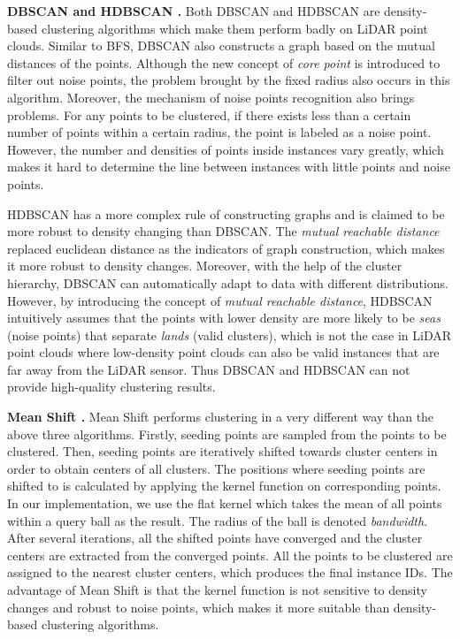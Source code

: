 \documentclass[final]{cvpr}
\begin{document}
\noindent\textbf{DBSCAN \cite{ester1996density} and HDBSCAN \cite{campello2013density}.}
Both DBSCAN and HDBSCAN are density-based clustering algorithms which make them perform badly on LiDAR point clouds.
Similar to BFS, DBSCAN also constructs a graph based on the mutual distances of the points.
Although the new concept of \textit{core point} is introduced to filter out noise points, the problem brought by the fixed radius
also occurs in this algorithm.
Moreover, the mechanism of noise points recognition also brings problems.
For any points to be clustered, if there exists less than a certain number of points within a certain radius, the point is labeled as a noise point.
However, the number and densities of points inside instances vary greatly, which makes it hard to determine the line between instances with little
points and noise points.

HDBSCAN has a more complex rule of constructing graphs and is claimed to be more robust to density changing than
DBSCAN.
The \textit{mutual reachable distance} replaced euclidean distance as the indicators of graph construction, which makes it more robust to
density changes.
Moreover, with the help of the cluster hierarchy, DBSCAN can automatically adapt to data with different distributions.
However, by introducing the concept of \textit{mutual reachable distance}, HDBSCAN intuitively assumes that the points with
lower density are more likely to be \textit{seas} (noise points) that separate \textit{lands} (valid clusters), which
is not the case in LiDAR point clouds where low-density point clouds can also be valid instances that are far away
from the LiDAR sensor.
Thus DBSCAN and HDBSCAN can not provide high-quality clustering results.

\noindent\textbf{Mean Shift \cite{comaniciu2002mean}.}
Mean Shift performs clustering in a very different way than the above three algorithms.
Firstly, seeding points are sampled from the points to be clustered.
Then, seeding points are iteratively shifted towards cluster centers in order
to obtain centers of all clusters.
The positions where seeding points are shifted to is calculated by applying the kernel function
on corresponding points.
In our implementation, we use the flat kernel which takes the mean of all points within a query ball
as the result.
The radius of the ball is denoted \textit{bandwidth}.
After several iterations, all the shifted points have converged and the cluster centers are extracted from the converged points.
All the points to be clustered are assigned to the nearest cluster centers, which produces the final instance IDs.
The advantage of Mean Shift is that the kernel function is not sensitive to density changes and robust to noise
points, which makes it more suitable than density-based clustering algorithms.
\end{document}
